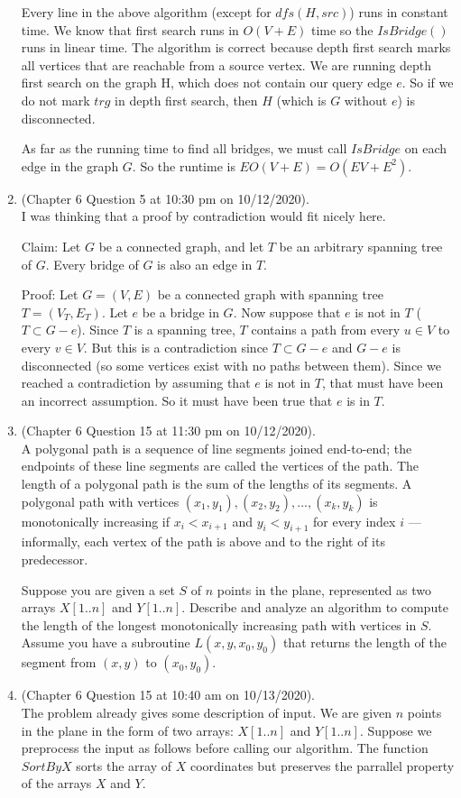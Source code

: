 \documentclass{article}
\begin{document}
\begin{enumerate}
        Every line in the above algorithm (except for $dfs(H, src)$) runs in constant time. We know that first search runs in $O(V + E)$ time so the $IsBridge()$ runs in linear time. The algorithm is correct because depth first search marks all vertices that are reachable from a source vertex. We are running depth first search on the graph H, which does not contain our query edge $e$. So if we do not mark $trg$ in depth first search, then $H$ (which is $G$ without $e$) is disconnected.

        As far as the running time to find all bridges, we must call $IsBridge$ on each edge in the graph $G$. So the runtime is $EO(V + E) = O(EV + E^2)$.
    \item (Chapter 6 Question 5 at 10:30 pm on 10/12/2020). \\
        I was thinking that a proof by contradiction would fit nicely here.

        Claim: Let $G$ be a connected graph, and let $T$ be an arbitrary spanning tree of $G$.
        Every bridge of $G$ is also an edge in $T$.

        Proof: Let $G = (V, E)$ be a connected graph with spanning tree $T = (V_T, E_T)$.
        Let $e$ be a bridge in $G$.
        Now suppose that $e$ is not in $T$ ($T \subset G - e$).
        Since $T$ is a spanning tree, $T$ contains a path from every $u \in V$ to every $v \in V$.
        But this is a contradiction since $T \subset G - e$ and $G- e$ is disconnected (so some vertices exist with no paths between them).
        Since we reached a contradiction by assuming that $e$ is not in $T$, that must have been an incorrect assumption.
        So it must have been true that $e$ is in $T$.
    \item (Chapter 6 Question 15 at 11:30 pm on 10/12/2020). \\
        A polygonal path is a sequence of line segments joined end-to-end; the endpoints of these line segments are called the vertices of the path.
        The length of a polygonal path is the sum of the lengths of its segments.
        A polygonal path with vertices $(x_1, y_1), (x_2, y_2), ... ,(x_k, y_k)$ is monotonically increasing if $x_i < x_{i+1}$ and $y_i < y_{i+1}$ for every index $i$ --- informally, each vertex of the path is above and to the right of its predecessor.

        Suppose you are given a set $S$ of $n$ points in the plane, represented as two arrays $X[1 .. n]$ and $Y [1 .. n]$.
        Describe and analyze an algorithm to compute the length of the longest monotonically increasing path with vertices in $S$.
        Assume you have a subroutine $L(x, y, x_0, y_0)$ that returns the length of the segment from $(x, y)$ to $(x_0, y_0)$.
    \item (Chapter 6 Question 15 at 10:40 am on 10/13/2020). \\
        The problem already gives some description of input.
        We are given $n$ points in the plane in the form of two arrays: $X[1..n]$ and $Y[1..n]$.
        Suppose we preprocess the input as follows before calling our algorithm.
        The function $SortByX$ sorts the array of $X$ coordinates but preserves the parrallel property of the arrays $X$ and $Y$.


\end{enumerate}
\end{document}
